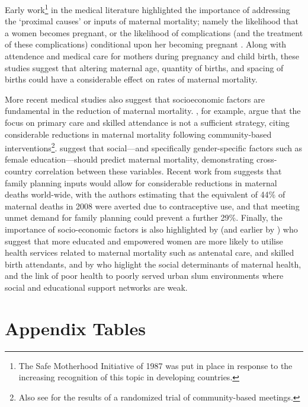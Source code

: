\documentclass{article}[12pt,subeqn]
\newcommand{\MMRfolder}{"/home/damiancclarke/investigacion/Activa/MMR"}
\begin{document}
\begin{spacing}{1.4}
Early work\footnote{The Safe Motherhood Initiative of 1987 was put in place in 
response to the increasing recognition of this topic in developing countries.} 
in the medical literature highlighted the importance of addressing the `proximal 
causes' or inputs of maternal mortality; namely the likelihood that a women 
becomes pregnant, or the likelihood of complications (and the treatment of these 
complications) conditional upon her becoming pregnant \citep{MccarthyMaine1992, 
GoodburnCampbell2001, TrusselPebley1984}.  Along with attendence and medical 
care for mothers during pregnancy and child birth, these studies suggest that 
altering maternal age, quantity of births, and spacing of births could have a 
considerable effect on rates of maternal mortality.  

More recent medical studies also suggest that socioeconomic factors are 
fundamental in the reduction of maternal mortality.  \citet{Costelloetal2004}, 
for example, argue that the focus on primary care and skilled attendance is 
not a sufficient strategy, citing considerable reductions in maternal mortality 
following community-based interventions\footnote{Also see 
\citet{Manandharetal2004} for the results of a randomized trial of 
community-based meetings.}.  \citet{McAlisterBaskett2006} suggest that 
social---and specifically gender-specific factors such as female 
education---should predict maternal mortality, demonstrating cross-country 
correlation between these variables. Recent work from \citet{Ahmedetal2012} 
suggests that family planning inputs would allow for considerable reductions in 
maternal deaths world-wide, with the authors estimating that the equivalent of 
44\% of maternal deaths in 2008 were averted due to contraceptive use, and that 
meeting unmet demand for family planning could prevent a further 29\%. Finally, 
the importance of socio-economic factors is also highlighted by 
\citet{Ahmedetal2010} (and earlier by \citet{ShenWilliamson1999}) who suggest 
that more educated and empowered women are more likely to utilise health 
services related to maternal mortality such as antenatal care, and skilled 
birth attendants, and by \citet{BhuttaBlack2013} who higlight the social 
determinants of maternal health, and the link of poor health to poorly served 
urban slum environments where social and educational support networks are weak.

\newpage
\section{Appendix Tables}
\label{scn:appTables}

%

\end{spacing}
\end{document}
